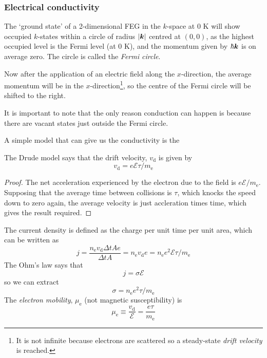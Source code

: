 \subsubsection{Electrical conductivity}
The `ground state' of a 2-dimensional FEG in the $k$-space at 0 K will show occupied $k$-states within a circle of radius $|\boldsymbol{k}|$ centred at $(0,0)$, as the highest occupied level is the Fermi level (at 0 K), and the momentum given by $\hbar\boldsymbol{k}$ is on average zero. The circle is called the \emph{Fermi circle}.\par
Now after the application of an electric field along the $x$-direction, the average momentum will be in the $x$-direction\footnote{It is not infinite because electrons are scattered so a steady-state \emph{drift velocity} is reached.}, so the centre of the Fermi circle will be shifted to the right.\par
It is important to note that the only reason conduction can happen is because there are vacant states just outside the Fermi circle.\par
A simple model that can give us the conductivity is the
\begin{thrm}
The Drude model says that the drift velocity, $v_{\mathrm{d}}$ is given by
\begin{equation}
	v_{\mathrm{d}}=e\mathcal{E}\tau/m_{\mathrm{e}}
\end{equation}
\end{thrm}
\begin{proof}
	The net acceleration experienced by the electron due to the field is $e\mathcal{E}/m_{\mathrm{e}}$. Supposing that the average time between collisions is $\tau$, which knocks the speed down to zero again, the average velocity is just accleration times time, which gives the result required.
\end{proof}
The current density is defined as the charge per unit time per unit area, which can be written as
\begin{equation}
	j=\frac{n_{\mathrm{e}}v_{\mathrm{d}}\Delta tAe}{\Delta tA}=n_{\mathrm{e}}v_{\mathrm{d}}e=n_{\mathrm{e}}e^2\mathcal{E}\tau/m_{\mathrm{e}}
\end{equation}
The Ohm's law says that 
\begin{equation}
	j=\sigma\mathcal{E}
\end{equation}
so we can extract
\begin{equation}
	\sigma=n_{\mathrm{e}}e^2\tau/m_{\mathrm{e}}
\end{equation}
The \emph{electron mobility}, $\mu_{\mathrm{e}}$ (not magnetic susceptibility) is 
\begin{equation}
	\mu_{\mathrm{e}}\equiv\frac{v_{\mathrm{d}}}{\mathcal{E}}=\frac{e\tau}{m_{\mathrm{e}}}
\end{equation}
